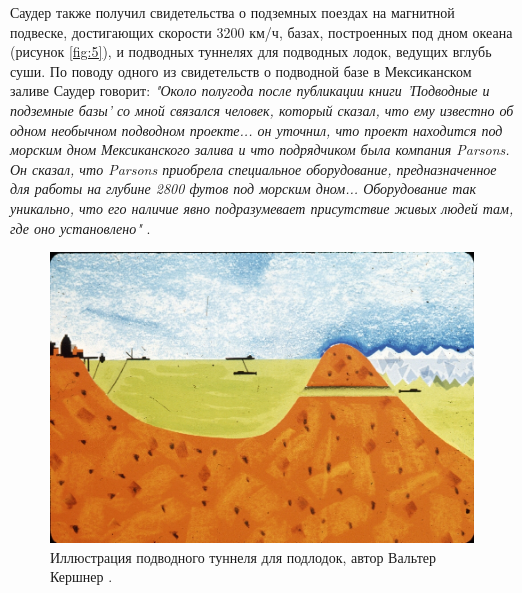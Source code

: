 \documentclass[10pt,twocolumn,letterpaper]{article}
\begin{document}
Саудер также получил свидетельства о подземных поездах на магнитной подвеске, достигающих скорости 3200 км/ч, базах, построенных под дном океана (рисунок \ref{fig:5}), и подводных туннелях для подводных лодок, ведущих вглубь суши. По поводу одного из свидетельств о подводной базе в Мексиканском заливе Саудер говорит: \textit{"Около полугода после публикации книги 'Подводные и подземные базы' со мной связался человек, который сказал, что ему известно об одном необычном подводном проекте... он уточнил, что проект находится под морским дном Мексиканского залива и что подрядчиком была компания Parsons. Он сказал, что Parsons приобрела специальное оборудование, предназначенное для работы на глубине 2800 футов под морским дном... Оборудование так уникально, что его наличие явно подразумевает присутствие живых людей там, где оно установлено"} \cite{22}.
\begin{figure}[t]
\begin{center}
   \includegraphics[width=1\linewidth]{sub.jpg}
\end{center}
   \caption{Иллюстрация подводного туннеля для подлодок, автор Вальтер Кершнер \cite{22,23}.}
\label{fig:6}
\label{fig:onecol}
\end{figure}
\end{document}
